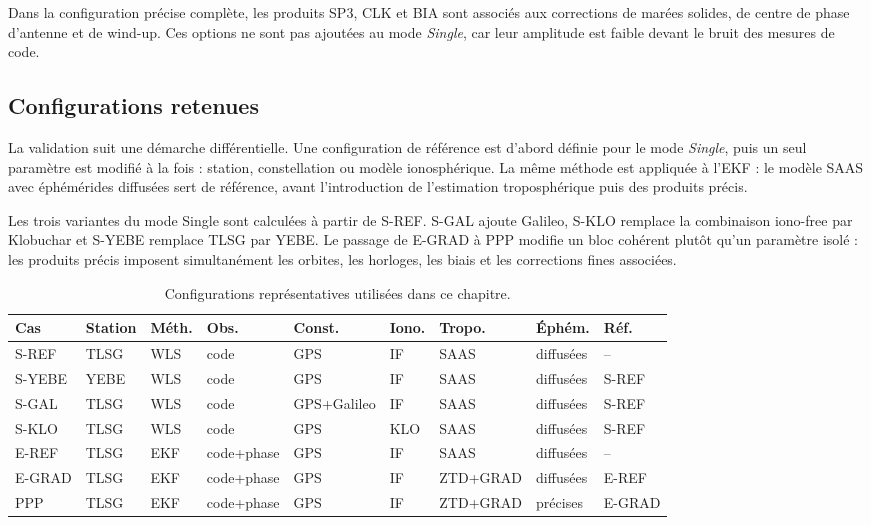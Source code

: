 Dans la configuration précise complète, les produits SP3, CLK et BIA sont
associés aux corrections de marées solides, de centre de phase d'antenne et de
wind-up. Ces options ne sont pas ajoutées au mode \emph{Single}, car leur
amplitude est faible devant le bruit des mesures de code.


\subsection{Configurations retenues}

La validation suit une démarche différentielle. Une configuration de référence
est d'abord définie pour le mode \emph{Single}, puis un seul paramètre est
modifié à la fois : station, constellation ou modèle ionosphérique. La même
méthode est appliquée à l'EKF : le modèle SAAS avec éphémérides diffusées sert
de référence, avant l'introduction de l'estimation troposphérique puis des
produits précis.

Les trois variantes du mode Single sont calculées à partir de S-REF. S-GAL
ajoute Galileo, S-KLO remplace la combinaison iono-free par Klobuchar et
S-YEBE remplace TLSG par YEBE. Le passage de E-GRAD à PPP modifie un bloc
cohérent plutôt qu'un paramètre isolé : les produits précis imposent
simultanément les orbites, les horloges, les biais et les corrections fines
associées.

\begin{table}[H]
\centering
\caption{Configurations représentatives utilisées dans ce chapitre.}
\label{tab:validation_cases}
\small
\setlength{\tabcolsep}{3pt}
\begin{tabularx}{\textwidth}{
    p{1.43cm} p{1.13cm} p{0.9cm} p{1.69cm} p{2.09cm}
    p{0.8cm} p{2.0cm} p{1.35cm} X}
\hline
\textbf{Cas} & \textbf{Station} & \textbf{Méth.} & \textbf{Obs.} &
\textbf{Const.} & \textbf{Iono.} & \textbf{Tropo.} &
\textbf{Éphém.} & \textbf{Réf.} \\
\hline
S-REF  & TLSG & WLS & code       & GPS         & IF  & SAAS     & diffusées & -- \\
S-YEBE & YEBE & WLS & code       & GPS         & IF  & SAAS     & diffusées & S-REF \\
S-GAL  & TLSG & WLS & code       & GPS+Galileo & IF  & SAAS     & diffusées & S-REF \\
S-KLO  & TLSG & WLS & code       & GPS         & KLO & SAAS     & diffusées & S-REF \\
E-REF  & TLSG & EKF & code+phase & GPS         & IF  & SAAS     & diffusées & -- \\
E-GRAD & TLSG & EKF & code+phase & GPS         & IF  & ZTD+GRAD & diffusées & E-REF \\
PPP    & TLSG & EKF & code+phase & GPS         & IF  & ZTD+GRAD & précises  & E-GRAD \\
\hline
\end{tabularx}
\end{table}

